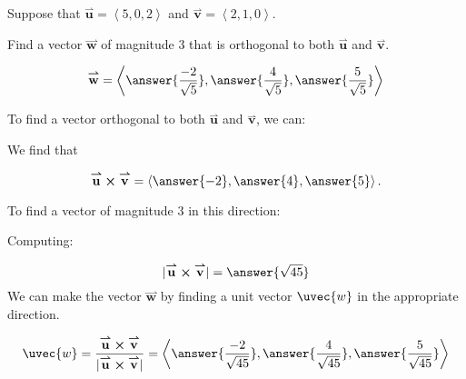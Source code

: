 \documentclass{ximera}
\author{Jim Talamo}
\begin{document}
\begin{exercise}
Suppose that $\overset{\boldsymbol{\rightharpoonup}}{\mathbf{u}} = \left< 5,0,2 \right>$ and $\overset{\boldsymbol{\rightharpoonup}}{\mathbf{v}} = \left< 2,1,0 \right>$.  

Find a vector $\overset{\boldsymbol{\rightharpoonup}}{\mathbf{w}}$ of magnitude 3 that is orthogonal to both $\overset{\boldsymbol{\rightharpoonup}}{\mathbf{u}}$ and $\overset{\boldsymbol{\rightharpoonup}}{\mathbf{v}}$.

\[
\overset{\boldsymbol{\rightharpoonup}}{\mathbf{w}} = \left< \answer{\frac{-2}{\sqrt{5}}},\answer{\frac{4}{\sqrt{5}}}, \answer{\frac{5}{\sqrt{5}}} \right>
\]


\begin{hint}
To find a vector orthogonal to both $\overset{\boldsymbol{\rightharpoonup}}{\mathbf{u}}$ and $\overset{\boldsymbol{\rightharpoonup}}{\mathbf{v}}$, we can:

\begin{multipleChoice}
\end{multipleChoice}

We find that

\[
\overset{\boldsymbol{\rightharpoonup}}{\mathbf{u}} \boldsymbol\times \overset{\boldsymbol{\rightharpoonup}}{\mathbf{v}} = \left< \answer{-2},\answer{4},\answer{5} \right>.
\]

To find a vector of magnitude 3 in this direction:

\begin{multipleChoice}
\end{multipleChoice}

Computing:

\[
|\overset{\boldsymbol{\rightharpoonup}}{\mathbf{u}} \boldsymbol\times \overset{\boldsymbol{\rightharpoonup}}{\mathbf{v}} | = \answer{\sqrt{45}}
\]
We can make the vector $\overset{\boldsymbol{\rightharpoonup}}{\mathbf{w}}$ by finding a unit vector $\uvec{w}$ in the appropriate direction.

\[
\uvec{w} = \frac{\overset{\boldsymbol{\rightharpoonup}}{\mathbf{u}} \boldsymbol\times \overset{\boldsymbol{\rightharpoonup}}{\mathbf{v}}}{|\overset{\boldsymbol{\rightharpoonup}}{\mathbf{u}} \boldsymbol\times \overset{\boldsymbol{\rightharpoonup}}{\mathbf{v}}|} = \left< \answer{\frac{-2}{\sqrt{45}}},\answer{\frac{4}{\sqrt{45}}}, \answer{\frac{5}{\sqrt{45}}} \right>
\]


\end{hint}
\end{exercise}
\end{document}
